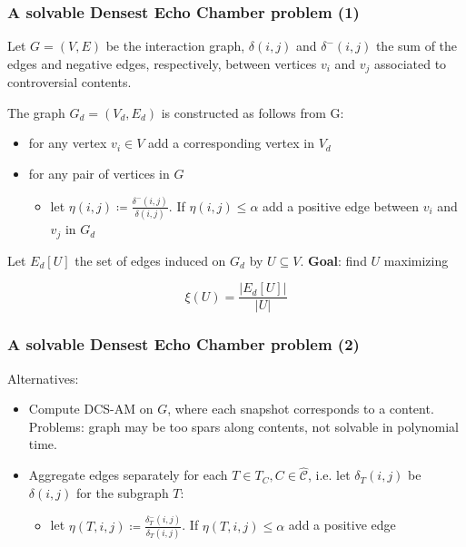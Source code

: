 \documentclass{beamer}
\begin{document}
\begin{frame}[c]
	\frametitle{A solvable Densest Echo Chamber problem (1)}
	Let $G = (V, E)$ be the interaction graph, $\delta(i, j)$ and $\delta^{-} (i, j)$ the sum of the
	edges and negative edges, respectively, between vertices $v_{i} $ and
	$v_{j} $ associated to controversial contents.

	\bigskip

	The graph $G_d = (V_{d}, E_{d}) $ is constructed as follows from G:

	\begin{itemize}
		\item for any vertex $v_{i} \in V$ add a corresponding vertex in $V_{d} $
		\item for any pair of vertices in $G $
		      \begin{itemize}
			      \item let $\eta(i,j) \coloneqq \frac{\delta^{-} (i,j)}{\delta
					            (i,j)} $. If $\eta(i,j) \leq \alpha $ add a positive
			            edge between $v_{i} $ and $v_{j} $ in $G_{d} $
		      \end{itemize}
	\end{itemize}

	Let $E_{d} [U]$ the set of edges induced on $G_d$ by $U \subseteq V$. \textbf{Goal}: find $U$ maximizing

	\begin{equation}
		\xi(U) = \frac{|E_{d} [U]|}{|U|}
	\end{equation}

\end{frame}

\begin{frame}[c]
	\frametitle{A solvable Densest Echo Chamber problem (2)}
	Alternatives:

	\begin{itemize}
		\item Compute DCS-AM on $G$, where each snapshot corresponds to a
		      content. Problems: graph may be too spars along contents, not
		      solvable in polynomial time.
		\item Aggregate edges separately for each $T \in T_{C}, C \in \hat{\mathcal{C}}$,
		      i.e. let $\delta_{T}(i,j) $ be $\delta(i, j)$ for the subgraph
		      $T$:
		      \begin{itemize}
			      \item let $\eta(T, i,j) \coloneqq \frac{\delta_{T} ^{-} (i,j)}{\delta
					            _{T} (i,j)} $. If $\eta(T, i,j) \leq \alpha $ add a positive
			            edge
		      \end{itemize}
	\end{itemize}
\end{frame}
\end{document}
